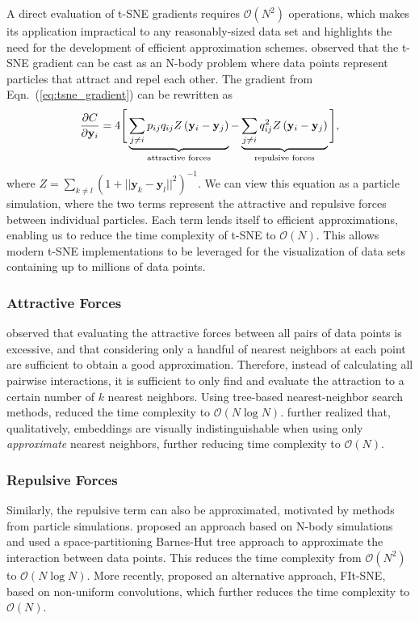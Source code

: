 \documentclass[article]{jss}
\begin{document}
A direct evaluation of t-SNE gradients requires $\mathcal{O}(N^2)$ operations,
which makes its application impractical to any reasonably-sized data set and
highlights the need for the development of efficient approximation schemes.
\citet{van2014accelerating} observed that the t-SNE gradient can be cast as an
N-body problem where data points represent particles that attract and repel each
other. The gradient from Eqn.~(\ref{eq:tsne_gradient}) can be rewritten as
\begin{equation}
\frac{\partial C}{\partial \mathbf{y}_i} = 4 \Bigg [
\underbrace{\sum_{j \neq i} p_{ij} q_{ij} Z \left ( \mathbf{y}_i - \mathbf{y}_j \right )}_{\text{attractive forces}}  -
\underbrace{\sum_{j \neq i} q_{ij}^2 Z \left ( \mathbf{y}_i - \mathbf{y}_j \right )}_{\text{repulsive forces}}
\Bigg ], \label{eq:grad_attr_rep} \notag
\end{equation}
where $Z = \sum_{k \neq l}\left ( 1 + || \mathbf{y}_k - \mathbf{y}_l ||^2 \right
)^{-1}$. We can view this equation as a particle simulation, where the
two terms represent the attractive and repulsive forces between individual
particles. Each term lends itself to efficient approximations, enabling us to
reduce the time complexity of t-SNE to $\mathcal{O}(N)$. This allows modern
t-SNE implementations to be leveraged for the visualization of data sets
containing up to millions of data points.

\subsubsection*{Attractive Forces}
\citet{van2014accelerating} observed that evaluating the attractive forces
between all pairs of data points is excessive, and that considering only a
handful of nearest neighbors at each point are sufficient to obtain a good
approximation. Therefore, instead of calculating all pairwise interactions, it
is sufficient to only find and evaluate the attraction to a certain number of
$k$ nearest neighbors. Using tree-based nearest-neighbor search methods,
\citet{van2014accelerating} reduced the time complexity to $\mathcal{O}(N \log
N)$. \citet{linderman2019fast} further realized that, qualitatively, embeddings
are visually indistinguishable when using only \textit{approximate} nearest
neighbors, further reducing time complexity to $\mathcal{O}(N)$.

\subsubsection*{Repulsive Forces}
Similarly, the repulsive term can also be approximated, motivated by methods from
particle simulations. \citet{van2014accelerating} proposed an approach based on
N-body simulations and used a space-partitioning Barnes-Hut tree approach to
approximate the interaction between data points. This reduces the time
complexity from $\mathcal{O}(N^2)$ to $\mathcal{O}(N \log N)$. More recently,
\citet{linderman2019fast} proposed an alternative approach, FIt-SNE, based on
non-uniform convolutions, which further reduces the time complexity to
$\mathcal{O}(N)$.
\end{document}
